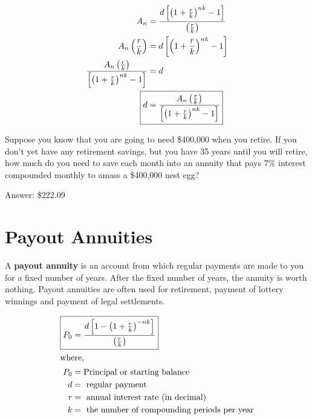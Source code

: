\begin{align}
  A_{n}
  &=\frac{d\left[ {\left( 1+\frac{r}{k} \right)}^{nk} - 1 \right]}
    {\left( \frac{r}{k} \right)} \notag \\
  A_{n}\left( \frac{r}{k} \right)
  &=d\left[ {\left( 1+\frac{r}{k} \right)}^{nk} - 1 \right] \notag \\
  \frac{A_{n}\left( \frac{r}{k} \right)}
  {\left[ {\left( 1+\frac{r}{k} \right)}^{nk} - 1 \right]}
  &=d \notag \\
  \Aboxed{d
  &=\frac
    {A_{n} \left( \frac{r}{k} \right)}
    {\left[ {\left( 1+\frac{r}{k} \right)}^{nk} - 1 \right]}}%
    \label{eq:savings-annuity-pmt}
\end{align}

\begin{exercise}
  Suppose you know that you are going to need \$400,000 when you
  retire. If you don't yet have any retirement savings, but you have
  35 years until you will retire, how much do you need to save each
  month into an annuity that pays 7\% interest compounded monthly to
  amass a \$400,000 nest egg?

  \noindent Answer: \$222.09
\end{exercise}

\newpage

\section{Payout Annuities}%
\label{sec:payout-annuities}

\begin{definition}
  A \textbf{payout annuity} is an account from which regular payments
  are made to you for a fixed number of years. After the fixed number
  of years, the annuity is worth nothing. Payout annuities are often
  used for retirement, payment of lottery winnings and payment of
  legal settlements.

  \begin{align}
    \Aboxed{P_{0}
    &= \frac{d\left[ {1 - \left( 1+\frac{r}{k} \right)}^{-nk} \right]}
      {\left( \frac{r}{k} \right)}} \label{eq:payout-annuity} \\
    \intertext{where,}
    P_{0} &= \text{Principal or starting balance} \notag \\
    d &= \text{ regular payment} \notag \\
    r &= \text{ annual interest rate (in decimal)} \notag \\
    k &= \text{ the number of compounding periods per year} \notag
  \end{align}
\end{definition}

